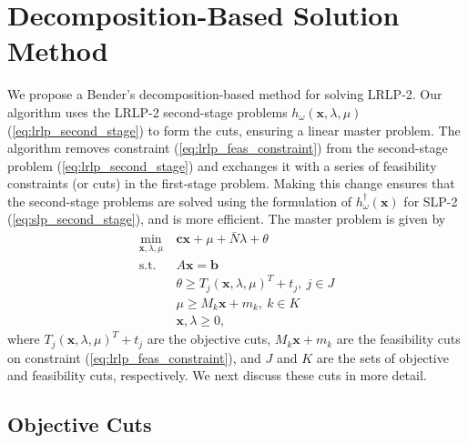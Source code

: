 \documentclass{iserc}
\newcommand{\x}{\mathbf{x}}
\renewcommand{\c}{\mathbf{c}}
\renewcommand{\b}{\mathbf{b}}
\newcommand{\st}{\mbox{s.t.}}
\begin{document}
\section{Decomposition-Based Solution Method} \label{sec:soln_algorithm}

We propose a Bender's decomposition-based method for solving LRLP-2.
Our algorithm uses the LRLP-2 second-stage problems $h_\omega(\x,\lambda,\mu)$ (\ref{eq:lrlp_second_stage}) to form the cuts, ensuring a linear master problem.
The algorithm removes constraint (\ref{eq:lrlp_feas_constraint}) from the second-stage problem (\ref{eq:lrlp_second_stage}) and exchanges it with a series of feasibility constraints (or cuts) in the first-stage problem.
Making this change ensures that the second-stage problems are solved using the formulation of $h^\dagger_\omega(\x)$ for SLP-2 (\ref{eq:slp_second_stage}), and is more efficient.
The master problem is given by
\begin{align}
	\min_{\x,\lambda,\mu} \ & \c\x + \mu + \bar{N}\lambda + \theta \label{eq:master_problem}\\
	\st \ & A\x = \b \nonumber \\
	& \theta \geq T_j (\x,\lambda,\mu)^T + t_j, \ j \in J \nonumber \\
	& \mu \geq M_k \x + m_k, \ k \in K \nonumber \\
	& \x,\lambda \geq 0, \nonumber
\end{align}
where $T_j (\x,\lambda,\mu)^T + t_j$ are the objective cuts, $M_k \x + m_k$ are the feasibility cuts on constraint (\ref{eq:lrlp_feas_constraint}), and $J$ and $K$ are the sets of objective and feasibility cuts, respectively.
We next discuss these cuts in more detail.

\subsection{Objective Cuts}
\end{document}
